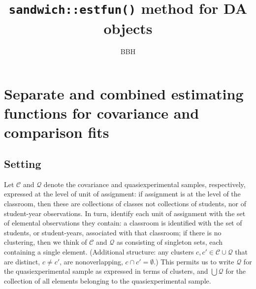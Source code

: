 \documentclass{article}
\author{BBH}
\title{\texttt{sandwich::estfun()} method for DA objects}
\begin{document}
\nobibliography*
\maketitle
\section{Separate and combined estimating functions for covariance and comparison fits}

\subsection{Setting}

Let $\mathcal{C}$ and $\mathcal{Q}$ denote the covariance and
quasiexperimental samples, respectively, expressed at the level of
unit of assignment: if assignment is at the level of the classroom,
then these are collections of classes not collections of students, nor
of student-year observations.  In turn, identify each unit of assignment
with the set of elemental observations they contain: a classroom is
identified with the
set of students, or student-years, associated with that classroom;
if there is no clustering, then we think of $\mathcal{C}$ and
$\mathcal{Q}$ as consisting of singleton sets, each containing a
single element.  (Additional structure: any clusters $c, c' \in \mathcal{C}
\cup \mathcal{Q}$ that are distinct, $c  \neq c'$, are nonoverlapping, $c \cap c' = \emptyset$.) This permits us to write $\mathcal{Q}$ for the
quasiexperimental sample as expressed in terms of clusters, and $\bigcup
\mathcal{Q}$ for the collection of all elements belonging to the
quasiexperimental sample.
\end{document}

